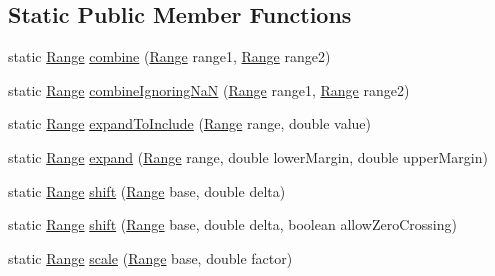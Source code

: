 \subsection*{Static Public Member Functions}
\begin{DoxyCompactItemize}
\item 
static \mbox{\hyperlink{classorg_1_1jfree_1_1data_1_1_range}{Range}} \mbox{\hyperlink{classorg_1_1jfree_1_1data_1_1_range_a885e176d7890aaf750c9aed1ea7cc41f}{combine}} (\mbox{\hyperlink{classorg_1_1jfree_1_1data_1_1_range}{Range}} range1, \mbox{\hyperlink{classorg_1_1jfree_1_1data_1_1_range}{Range}} range2)
\item 
static \mbox{\hyperlink{classorg_1_1jfree_1_1data_1_1_range}{Range}} \mbox{\hyperlink{classorg_1_1jfree_1_1data_1_1_range_a820962f424990e7f42bdcc86f43a417f}{combine\+Ignoring\+NaN}} (\mbox{\hyperlink{classorg_1_1jfree_1_1data_1_1_range}{Range}} range1, \mbox{\hyperlink{classorg_1_1jfree_1_1data_1_1_range}{Range}} range2)
\item 
static \mbox{\hyperlink{classorg_1_1jfree_1_1data_1_1_range}{Range}} \mbox{\hyperlink{classorg_1_1jfree_1_1data_1_1_range_abfc602ab8018a33a304b918b17717a26}{expand\+To\+Include}} (\mbox{\hyperlink{classorg_1_1jfree_1_1data_1_1_range}{Range}} range, double value)
\item 
static \mbox{\hyperlink{classorg_1_1jfree_1_1data_1_1_range}{Range}} \mbox{\hyperlink{classorg_1_1jfree_1_1data_1_1_range_a9c50b697926bf73389dc54f4659c927d}{expand}} (\mbox{\hyperlink{classorg_1_1jfree_1_1data_1_1_range}{Range}} range, double lower\+Margin, double upper\+Margin)
\item 
static \mbox{\hyperlink{classorg_1_1jfree_1_1data_1_1_range}{Range}} \mbox{\hyperlink{classorg_1_1jfree_1_1data_1_1_range_a9108f26775569665ffb11174293f4c5f}{shift}} (\mbox{\hyperlink{classorg_1_1jfree_1_1data_1_1_range}{Range}} base, double delta)
\item 
static \mbox{\hyperlink{classorg_1_1jfree_1_1data_1_1_range}{Range}} \mbox{\hyperlink{classorg_1_1jfree_1_1data_1_1_range_a994b03849da28dbb049c218b876c9094}{shift}} (\mbox{\hyperlink{classorg_1_1jfree_1_1data_1_1_range}{Range}} base, double delta, boolean allow\+Zero\+Crossing)
\item 
static \mbox{\hyperlink{classorg_1_1jfree_1_1data_1_1_range}{Range}} \mbox{\hyperlink{classorg_1_1jfree_1_1data_1_1_range_af35eee30dfe7dc99e2b380e2c876ffce}{scale}} (\mbox{\hyperlink{classorg_1_1jfree_1_1data_1_1_range}{Range}} base, double factor)
\end{DoxyCompactItemize}


